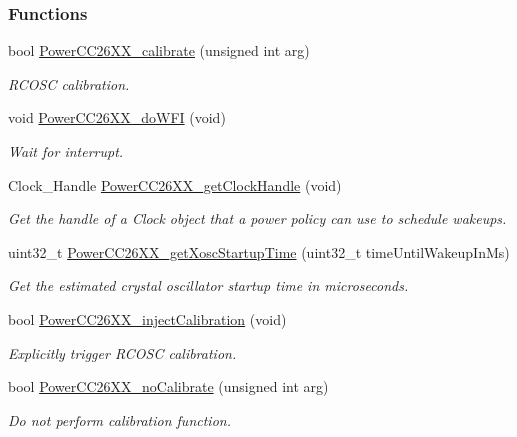 \subsubsection*{Functions}
\begin{DoxyCompactItemize}
\item 
bool \hyperlink{_power_c_c26_x_x_8h_a27a4c7312d5cf59eb699ad5f87104408}{Power\+C\+C26\+X\+X\+\_\+calibrate} (unsigned int arg)
\begin{DoxyCompactList}\small\item\em R\+C\+O\+S\+C calibration. \end{DoxyCompactList}\item 
void \hyperlink{_power_c_c26_x_x_8h_ad4ff77b3854dd494aac42e42f70bdee7}{Power\+C\+C26\+X\+X\+\_\+do\+W\+F\+I} (void)
\begin{DoxyCompactList}\small\item\em Wait for interrupt. \end{DoxyCompactList}\item 
Clock\+\_\+\+Handle \hyperlink{_power_c_c26_x_x_8h_ac0252fff9a2e243ce3c13fbd50be5adb}{Power\+C\+C26\+X\+X\+\_\+get\+Clock\+Handle} (void)
\begin{DoxyCompactList}\small\item\em Get the handle of a Clock object that a power policy can use to schedule wakeups. \end{DoxyCompactList}\item 
uint32\+\_\+t \hyperlink{_power_c_c26_x_x_8h_ace6e106b5cef8823de93a6d4b66ca964}{Power\+C\+C26\+X\+X\+\_\+get\+Xosc\+Startup\+Time} (uint32\+\_\+t time\+Until\+Wakeup\+In\+Ms)
\begin{DoxyCompactList}\small\item\em Get the estimated crystal oscillator startup time in microseconds. \end{DoxyCompactList}\item 
bool \hyperlink{_power_c_c26_x_x_8h_aac76ed82c4d33897111e7e3e863e2c9c}{Power\+C\+C26\+X\+X\+\_\+inject\+Calibration} (void)
\begin{DoxyCompactList}\small\item\em Explicitly trigger R\+C\+O\+S\+C calibration. \end{DoxyCompactList}\item 
bool \hyperlink{_power_c_c26_x_x_8h_a39c82b7c57a1b5c013f5e285e98232e9}{Power\+C\+C26\+X\+X\+\_\+no\+Calibrate} (unsigned int arg)
\begin{DoxyCompactList}\small\item\em Do not perform calibration function. \end{DoxyCompactList}\item 

\end{DoxyCompactItemize}
